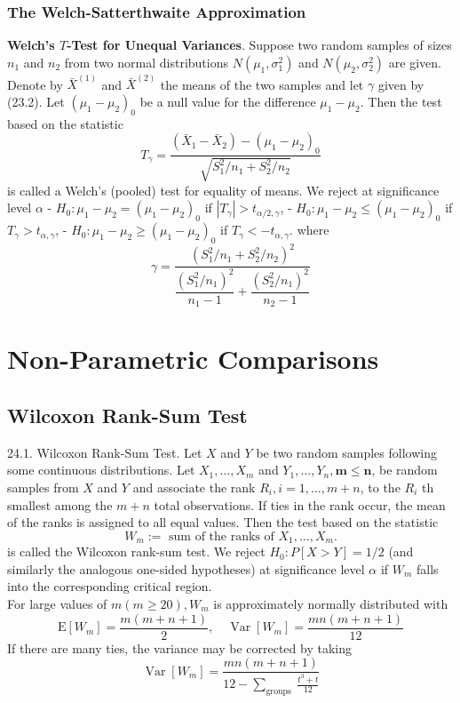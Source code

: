 \documentclass[a4paper,12pt]{article}
\begin{document}
\subsubsection{The Welch-Satterthwaite Approximation}
\textbf{Welch's $T$-Test for Unequal Variances}. Suppose two random samples of sizes $n_1$ and $n_2$ from two normal distributions $N\left(\mu_1, \sigma_1^2\right)$ and $N\left(\mu_2, \sigma_2^2\right)$ are given.
Denote by $\bar{X}^{(1)}$ and $\bar{X}^{(2)}$ the means of the two samples and let $\gamma$ given by (23.2). Let $\left(\mu_1-\mu_2\right)_0$ be a null value for the difference $\mu_1-\mu_2$. Then the test based on the statistic
$$
T_\gamma=\frac{\left(\bar{X}_1-\bar{X}_2\right)-\left(\mu_1-\mu_2\right)_0}{\sqrt{S_1^2 / n_1+S_2^2 / n_2}}
$$
is called a Welch's (pooled) test for equality of means. We reject at significance level $\alpha$
- $H_0: \mu_1-\mu_2=\left(\mu_1-\mu_2\right)_0$ if $\left|T_\gamma\right|>t_{\alpha / 2, \gamma}$,
- $H_0: \mu_1-\mu_2 \leq\left(\mu_1-\mu_2\right)_0$ if $T_\gamma>t_{\alpha, \gamma}$,
- $H_0: \mu_1-\mu_2 \geq\left(\mu_1-\mu_2\right)_0$ if $T_\gamma<-t_{\alpha, \gamma}$.
where 
\begin{equation}
    \gamma = \dfrac{(S_1^2/n_1+S_2^2/n_2)^2}{\dfrac{(S_1^2/n_1)^2}{n_1-1}+\dfrac{(S_2^2/n_1)^2}{n_2-1}}
\end{equation}


\section{Non-Parametric Comparisons}
\subsection{Wilcoxon Rank-Sum Test}
24.1. Wilcoxon Rank-Sum Test. Let $X$ and $Y$ be two random samples following some continuous distributions.
Let $X_1, \ldots, X_m$ and $Y_1, \ldots, Y_n, \boldsymbol{m} \leq \boldsymbol{n}$, be random samples from $X$ and $Y$ and associate the rank $R_i, i=1, \ldots, m+n$, to the $R_i$ th smallest among the $m+n$ total observations. If ties in the rank occur, the mean of the ranks is assigned to all equal values.
Then the test based on the statistic
$$
W_m:=\text { sum of the ranks of } X_1, \ldots, X_m .
$$
is called the Wilcoxon rank-sum test.
We reject $H_0: P[X>Y]=1 / 2$ (and similarly the analogous one-sided hypotheses) at significance level $\alpha$ if $W_m$ falls into the corresponding critical region.\\
For large values of $m(m \geq 20), W_m$ is approximately normally distributed with
$$
\mathrm{E}\left[W_m\right]=\frac{m(m+n+1)}{2}, \quad \operatorname{Var}\left[W_m\right]=\frac{m n(m+n+1)}{12}
$$
If there are many ties, the variance may be corrected by taking
$$
\operatorname{Var}\left[W_m\right]=\frac{m n(m+n+1)}{12-\sum_{\text {groups }} \frac{t^3+t}{12}}
$$
\end{document}
